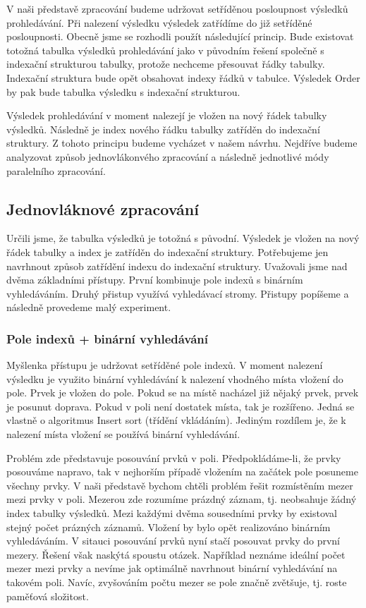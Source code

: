 V naši představě zpracování budeme udržovat setříděnou posloupnost výsledků prohledávání.
Při nalezení výsledku výsledek zatřídíme do již setříděné posloupnosti.
Obecně jsme se rozhodli použít následující princip.
Bude existovat totožná tabulka výsledků prohledávání jako v původním řešení společně s indexační strukturou tabulky, protože nechceme přesouvat řádky tabulky.
Indexační struktura bude opět obsahovat indexy řádků v tabulce.
Výsledek Order by pak bude tabulka výsledku s indexační strukturou.

Výsledek prohledávání v moment nalezejí je vložen na nový řádek tabulky výsledků.
Následně je index nového řádku tabulky zatříděn do indexační struktury.
Z tohoto principu budeme vycházet v našem návrhu.
Nejdříve budeme analyzovat způsob jednovlákonvého zpracování a následně jednotlivé módy paralelního zpracování.

\subsection{Jednovláknové zpracování} \label{anal.ordeby.single}

Určili jsme, že tabulka výsledků je totožná s původní.
Výsledek je vložen na nový řádek tabulky a index je zatříděn do indexační struktury.
Potřebujeme jen navrhnout způsob zatřídění indexu do indexační struktury.
Uvažovali jsme nad dvěma základními přístupy.
První kombinuje pole indexů s binárním vyhledáváním.
Druhý přistup využívá vyhledávací stromy.
Přistupy popíšeme a následně provedeme malý experiment.

\subsubsection{Pole indexů + binární vyhledávání}

Myšlenka přístupu je udržovat setříděné pole indexů. 
V moment nalezení výsledku je využito binární vyhledávání \citep[str. 26]{labyrint} k nalezení vhodného místa vložení do pole.
Prvek je vložen do pole.
Pokud se na místě nacházel již nějaký prvek, prvek je posunut doprava.
Pokud v poli není dostatek místa, tak je rozšířeno.
Jedná se vlastně o algoritmus Insert sort (třídění vkládáním).
Jediným rozdílem je, že k nalezení místa vložení se používá binární vyhledávání.

Problém zde představuje posouvání prvků v poli.
Předpokládáme-li, že prvky posouváme napravo, tak v nejhorším případě vložením na začátek pole posuneme všechny prvky.
V naši představě bychom chtěli problém řešit rozmístěním mezer mezi prvky v poli.
Mezerou zde rozumíme prázdný záznam, tj. neobsahuje žádný index tabulky výsledků.
Mezi každými dvěma sousedními prvky by existoval stejný počet prázných záznamů.
Vložení by bylo opět realizováno binárním vyhledáváním.
V sitauci posouvání prvků nyní stačí posouvat prvky do první mezery.
Řešení však naskýtá spoustu otázek.
Například neznáme ideální počet mezer mezi prvky a nevíme jak optimálně navrhnout binární vyhledávání na takovém poli.
Navíc, zvyšováním počtu mezer se pole značně zvětšuje, tj. roste paměťová složitost.


